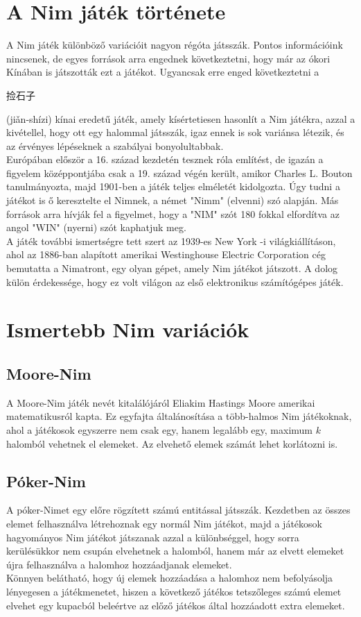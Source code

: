 \section{A Nim játék története}
A Nim játék különböző variációit nagyon régóta játsszák. Pontos információink nincsenek, de egyes források arra engednek következtetni, hogy már az ókori Kínában is játszották ezt a játékot. Ugyancsak erre enged következtetni a \begin{CJK*}{UTF8}{gbsn}捡石子\end{CJK*}
(jiǎn-shízi) kínai eredetű játék, amely kísértetiesen hasonlít a Nim játékra, azzal a kivétellel, hogy ott egy halommal játsszák, igaz ennek is sok variánsa létezik, és az érvényes lépéseknek a szabályai bonyolultabbak. \\
Európában először a 16. század kezdetén tesznek róla említést, de igazán a figyelem középpontjába csak a 19. század végén került, amikor Charles L. Bouton tanulmányozta, majd 1901-ben a játék teljes elméletét kidolgozta. Úgy tudni a játékot is ő keresztelte el Nimnek, a német "Nimm" (elvenni) szó alapján. Más források arra hívják fel a figyelmet, hogy a "NIM" szót 180 fokkal elfordítva az angol "WIN" (nyerni) szót kaphatjuk meg. \\
A játék további ismertségre tett szert az 1939-es New York -i világkiállításon, ahol az 1886-ban alapított amerikai Westinghouse Electric Corporation cég bemutatta a Nimatront, egy olyan gépet, amely Nim játékot játszott. A dolog külön érdekessége, hogy ez volt világon az első elektronikus számítógépes játék.

\section{Ismertebb Nim variációk}
\subsection{Moore-Nim}
A Moore-Nim játék nevét kitalálójáról Eliakim Hastings Moore amerikai matematikusról kapta. Ez egyfajta általánosítása a több-halmos Nim játékoknak, ahol a játékosok egyszerre nem csak egy, hanem legalább egy, maximum $k$ halomból vehetnek el elemeket. Az elvehető elemek számát lehet korlátozni is.

\subsection{Póker-Nim}
A póker-Nimet egy előre rögzített számú entitással játsszák. Kezdetben az összes elemet felhasználva létrehoznak egy normál Nim játékot, majd a játékosok hagyományos Nim játékot játszanak azzal a különbséggel, hogy sorra kerülésükkor nem csupán elvehetnek a halomból, hanem már az elvett elemeket újra felhasználva a halomhoz hozzáadjanak elemeket. \\
Könnyen belátható, hogy új elemek hozzáadása a halomhoz nem befolyásolja lényegesen a játékmenetet, hiszen a következő játékos tetszőleges számú elemet elvehet egy kupacból beleértve az előző játékos által hozzáadott extra elemeket.

